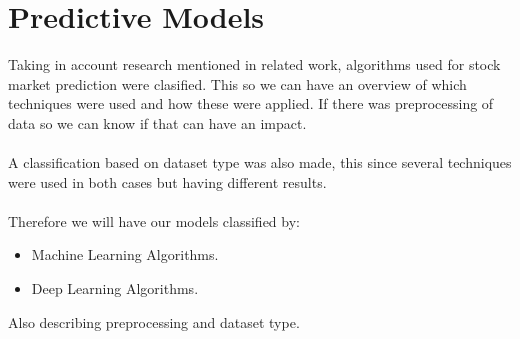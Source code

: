 \documentclass[conference]{IEEEtran}
\begin{document}
\section{Predictive Models}
Taking in account research mentioned in related work, algorithms used for stock market prediction were clasified. This so we can have an overview of which techniques were used
and how these were applied. If there was preprocessing of data so we can know if that can have an impact.
\\\\
A classification based on dataset type was also made, this since several techniques were used in both cases but having  different results. 
\\\\
Therefore we will have our models classified by:
\begin{itemize}
  \item Machine Learning Algorithms.
  \item Deep Learning Algorithms.
\end{itemize}
Also describing preprocessing and dataset type.
\end{document}
